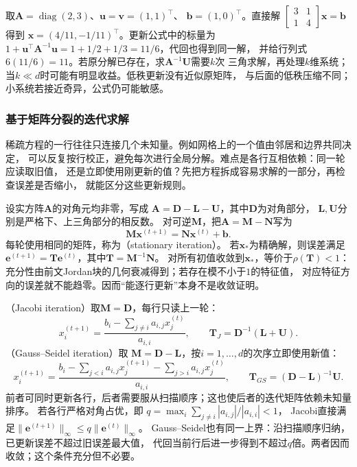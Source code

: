 取$\bm A=\operatorname{diag}(2,3)$、$\bm u=\bm v=(1,1)^\top$、
$\bm b=(1,0)^\top$。直接解
$\left[\begin{smallmatrix}3&1\\1&4\end{smallmatrix}\right]\bm x=\bm b$得到
$\bm x=(4/11,-1/11)^\top$。更新公式中的标量为
$1+\bm u^\top\bm A^{-1}\bm u=1+1/2+1/3=11/6$，代回也得到同一解，
并给行列式$6(11/6)=11$。若原分解已存在，求$\bm A^{-1}\bm U$需要$k$次
三角求解，再处理$k$维系统；当$k\ll d$时可能有明显收益。低秩更新没有近似原矩阵，
与后面的低秩压缩不同；小系统若接近奇异，公式仍可能敏感。

\subsubsection{基于矩阵分裂的迭代求解}
\label{sec:linear-algebra-stationary-splitting}

稀疏方程的一行往往只连接几个未知量。例如网格上的一个值由邻居和边界共同决定，
可以反复按行校正，避免每次进行全局分解。难点是各行互相依赖：同一轮应读取旧值，
还是立即使用刚更新的值？先把方程拆成容易求解的一部分，再检查误差是否缩小，
就能区分这些更新规则。

设实方阵$\bm A$的对角元均非零，写成
$\bm A=\bm D-\bm L-\bm U$，其中$\bm D$为对角部分，
$\bm L,\bm U$分别是严格下、上三角部分的相反数。
对可逆$\bm M$，把$\bm A=\bm M-\bm N$写为
\[
 \bm M\bm x^{(t+1)}=\bm N\bm x^{(t)}+\bm b.
\]
每轮使用相同的矩阵，称为（stationary iteration）。
若$\bm x_*$为精确解，则误差满足
$\bm e^{(t+1)}=\bm T\bm e^{(t)}$，其中$\bm T=\bm M^{-1}\bm N$。
对所有初值收敛到$\bm x_*$，等价于$\rho(\bm T)<1$：
充分性由前文Jordan块的几何衰减得到；若存在模不小于$1$的特征值，
对应特征方向的误差就不能趋零。因而“能逐行更新”本身不是收敛证明。

（Jacobi iteration）取$\bm M=\bm D$，每行只读上一轮：
\[
 x_i^{(t+1)}=
 \frac{b_i-\sum_{j\ne i}a_{i,j}x_j^{(t)}}{a_{i,i}},
 \qquad \bm T_J=\bm D^{-1}(\bm L+\bm U).
\]
（Gauss--Seidel iteration）取
$\bm M=\bm D-\bm L$，按$i=1,\ldots,d$的次序立即使用新值：
\[
 x_i^{(t+1)}=
 \frac{b_i-\sum_{j<i}a_{i,j}x_j^{(t+1)}
             -\sum_{j>i}a_{i,j}x_j^{(t)}}{a_{i,i}},
 \qquad \bm T_{GS}=(\bm D-\bm L)^{-1}\bm U.
\]
前者可同时更新各行，后者需要服从扫描顺序；这也使后者的迭代矩阵依赖未知量排序。
若各行严格对角占优，即
$q=\max_i\sum_{j\ne i}|a_{i,j}|/|a_{i,i}|<1$，
Jacobi直接满足$\|\bm e^{(t+1)}\|_\infty\leq q\|\bm e^{(t)}\|_\infty$。
Gauss--Seidel也有同一上界：沿扫描顺序归纳，已更新误差不超过旧误差最大值，
代回当前行后进一步得到不超过$q$倍。两者因而收敛；这个条件充分但不必要。

